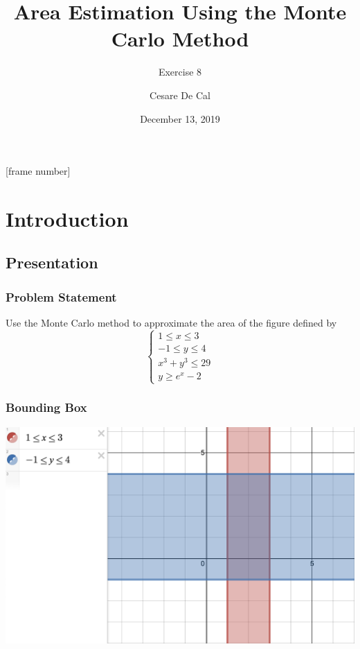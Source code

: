 \documentclass{beamer}
\title{Area Estimation Using the Monte Carlo Method}
\subtitle{Exercise 8}
\author{Cesare De Cal}
\date{December 13, 2019}
\begin{document}
[frame number]{}


\begin{frame}
\titlepage
\end{frame}

\section{Introduction}
\subsection{Presentation}
\begin{frame}
\frametitle{Problem Statement}
Use the Monte Carlo method to approximate the area of the figure defined by
$$
\begin{cases}
1 \le x \le 3 \\
-1\le y \le 4 \\  
x^3+y^3\le 29 \\
y \ge e^x -2
\end{cases}$$
\end{frame}

\begin{frame}
\frametitle{Bounding Box}
\includegraphics[width=\textwidth,height=\textheight,keepaspectratio]{bounding_box.png}
\end{frame}
\end{document}
